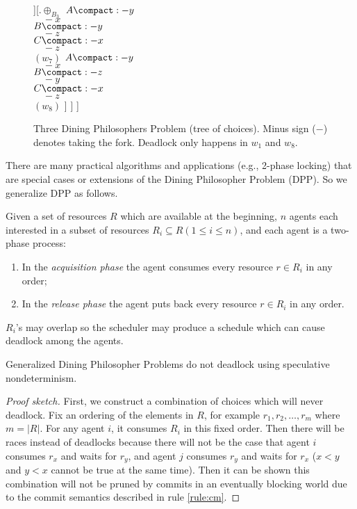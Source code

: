 \begin{figure}
        ][.$\oplus_{B_3}$
            {$A\compact:-y$ \\ $\quad-x$ \\ $B\compact:-y$ \\ $\quad-z$ \\ $C\compact:-x$ \\ $\quad-z$ \\ $(w_7)$}
            {\bk$A\compact:-y$ \\ \bk$\quad-x$ \\ \bk$B\compact:-z$ \\ \bk$\quad-y$ \\ \bk$C\compact:-x$ \\ \bk$\quad-z$ \\ $(w_8)$}
        ]
    ]
]
\caption{Three Dining Philosophers Problem (tree of choices). Minus sign ($-$) denotes taking the fork. Deadlock only happens in $w_1$ and $w_8$.}
\label{fig:diningrun}
\shrink
\end{figure}

There are many practical algorithms and applications (e.g., 2-phase locking)
that are special cases or extensions of the Dining Philosopher Problem (DPP). 
So we generalize DPP as follows.
\begin{definition}
Given a set of resources $R$ which are available at the beginning, 
$n$ agents each interested in a subset of resources 
$R_i\subseteq R (1\le i\le n)$, and each agent is a two-phase process:
  \begin{enumerate}
    \item In the \emph{acquisition phase} the agent consumes every resource $r\in R_i$ in any order;
    \item In the \emph{release phase} the agent puts back every resource $r\in R_i$ in any order.
  \end{enumerate}
  $R_i$'s may overlap so the scheduler may produce a schedule which can cause deadlock 
among the agents.
\end{definition}

\begin{theorem} Generalized Dining Philosopher Problems do not deadlock 
using speculative nondeterminism.
\end{theorem}
\begin{proof}[Proof sketch]
First, we construct a combination of choices which will never deadlock. 
Fix an ordering of the elements in $R$, for example $r_1,r_2,\dots,r_m$ where $m=|R|$. 
For any agent $i$, it consumes $R_i$ in this fixed order. 
Then there will be races instead of deadlocks because there will not be the 
case that agent $i$ consumes $r_x$ and waits for $r_y$, and agent $j$ consumes
$r_y$ and waits for $r_x$ ($x<y$ and $y<x$ cannot be true at the same time). 
Then it can be shown this combination will not be pruned by commits in an 
eventually blocking world due to the commit semantics described in rule \ref{rule:cm}. 
\end{proof}
